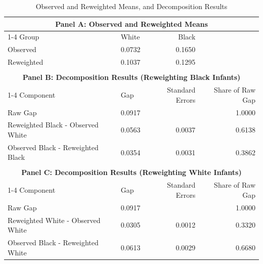 \begin{table}[ht]
\centering
\caption{Observed and Reweighted Means, and Decomposition Results}
\label{tab:gap_testing_ipw}
\begin{tabular}{llrr}
  \toprule
  \multicolumn{4}{c}{\textbf{Panel A: Observed and Reweighted Means}} \\
  \cmidrule(lr){1-4}
  Group & White & Black \\ 
  \midrule
  Observed & 0.0732 & 0.1650 \\ 
  Reweighted & 0.1037 & 0.1295 \\ 
  \bottomrule
  \\
  \toprule
  \multicolumn{4}{c}{\textbf{Panel B: Decomposition Results (Reweighting Black Infants)}} \\
  \cmidrule(lr){1-4}
  Component & Gap & Standard Errors & Share of Raw Gap \\ 
  \midrule
  Raw Gap & 0.0917 &  & 1.0000 \\ 
  Reweighted Black - Observed White & 0.0563 & 0.0037 & 0.6138 \\ 
  Observed Black - Reweighted Black & 0.0354 & 0.0031 & 0.3862 \\ 
  \bottomrule
  \\
  \toprule
  \multicolumn{4}{c}{\textbf{Panel C: Decomposition Results (Reweighting White Infants)}} \\
  \cmidrule(lr){1-4}
  Component & Gap & Standard Errors & Share of Raw Gap \\ 
  \midrule
  Raw Gap & 0.0917 &  & 1.0000 \\ 
  Reweighted White - Observed White & 0.0305 & 0.0012 & 0.3320 \\ 
  Observed Black - Reweighted White & 0.0613 & 0.0029 & 0.6680 \\ 
  \bottomrule
\end{tabular}
\end{table}
